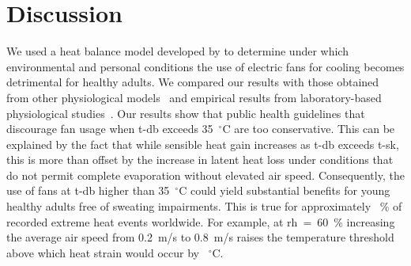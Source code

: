 
\section{Discussion}\label{sec:discussion}


We used a heat balance model developed by  to determine under which environmental and personal conditions the use of electric fans for cooling becomes detrimental for healthy adults.
We compared our results with those obtained from other physiological models~\cite{Jay2015, iso7933} and empirical results from laboratory-based physiological studies~\cite{Rate2015, Morris2019}.
Our results show that public health guidelines that discourage fan usage when \ac{t-db} exceeds 35~$^{\circ}$C are too conservative.
This can be explained by the fact that while sensible heat gain increases as \ac{t-db} exceeds \ac{t-sk}, this is more than offset by the increase in latent heat loss under conditions that do not permit complete evaporation without elevated air speed.
Consequently, the use of fans at \ac{t-db} higher than 35~$^{\circ}$C could yield substantial benefits for young healthy adults free of sweating impairments.
This is true for approximately ~\% of recorded extreme heat events worldwide.
For example, at \ac{rh}~=~60~\% increasing the average air speed from 0.2~m/s to 0.8~m/s raises the temperature threshold above which heat strain would occur by ~$^{\circ}$C.\@

